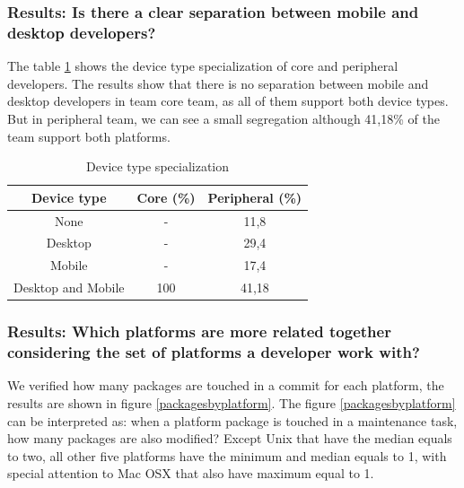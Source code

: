 \documentclass[10pt, conference]{IEEEtran}
\begin{document}
\subsubsection{Results: Is there a clear separation between mobile and desktop developers?}

The table \ref{devicetype} shows the device type specialization of core and peripheral developers. The results show that there is no separation between mobile and desktop developers in team core team, as all of them support both device types. But in peripheral team, we can see a small segregation although 41,18\% of the team support both platforms.       


\begin{table}[h]
\renewcommand{\arraystretch}{1.3}
\caption{Device type specialization}
\label{devicetype}
\centering
\begin{tabular}{|c|c|c|}
\hline
 Device type & Core (\%) & Peripheral (\%) \\
\hline
None & 			- & 		11,8   \\
\hline
Desktop & 		- & 		29,4  \\
\hline
Mobile & 		- & 		17,4 \\
\hline
Desktop and Mobile & 100 & 41,18  \\
\hline

\end{tabular}
\end{table} 






\subsubsection{Results: Which platforms are more related together considering the set of platforms a developer work with? }

We verified how many packages are touched in a commit for each platform, the results are shown in figure \ref{packagesbyplatform}. The figure \ref{packagesbyplatform} can be interpreted as: when a platform package is touched in a maintenance task, how many packages are also modified? Except Unix that have the median equals to two, all other five platforms have the minimum and median equals to 1, with special attention to Mac OSX that also have maximum equal to 1.  
\end{document}
